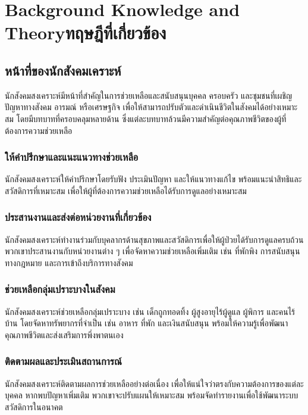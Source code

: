 \chapter{\ifenglish Background Knowledge and Theory\else ทฤษฎีที่เกี่ยวข้อง\fi}

\section{หน้าที่ของนักสังคมเคราะห์}

นักสังคมสงเคราะห์มีหน้าที่สำคัญในการช่วยเหลือและสนับสนุนบุคคล ครอบครัว และชุมชนที่เผชิญปัญหาทางสังคม อารมณ์ หรือเศรษฐกิจ เพื่อให้สามารถปรับตัวและดำเนินชีวิตในสังคมได้อย่างเหมาะสม โดยมีบทบาทที่ครอบคลุมหลายด้าน ซึ่งแต่ละบทบาทล้วนมีความสำคัญต่อคุณภาพชีวิตของผู้ที่ต้องการความช่วยเหลือ

\subsection{ให้คำปรึกษาและแนะแนวทางช่วยเหลือ}

นักสังคมสงเคราะห์ให้คำปรึกษาโดยรับฟัง ประเมินปัญหา และให้แนวทางแก้ไข พร้อมแนะนำสิทธิและสวัสดิการที่เหมาะสม เพื่อให้ผู้ที่ต้องการความช่วยเหลือได้รับการดูแลอย่างเหมาะสม
\subsection{ประสานงานและส่งต่อหน่วยงานที่เกี่ยวข้อง}

นักสังคมสงเคราะห์ทำงานร่วมกับบุคลากรด้านสุขภาพและสวัสดิการเพื่อให้ผู้ป่วยได้รับการดูแลครบถ้วน พวกเขาประสานงานกับหน่วยงานต่าง ๆ เพื่อจัดหาความช่วยเหลือเพิ่มเติม เช่น ที่พักพิง การสนับสนุนทางกฎหมาย และการเข้าถึงบริการทางสังคม

\subsection{ช่วยเหลือกลุ่มเปราะบางในสังคม}

นักสังคมสงเคราะห์ช่วยเหลือกลุ่มเปราะบาง เช่น เด็กถูกทอดทิ้ง ผู้สูงอายุไร้ผู้ดูแล ผู้พิการ และคนไร้บ้าน โดยจัดหาทรัพยากรที่จำเป็น เช่น อาหาร ที่พัก และเงินสนับสนุน พร้อมให้ความรู้เพื่อพัฒนาคุณภาพชีวิตและส่งเสริมการพึ่งพาตนเอง
\subsection{ติดตามผลและประเมินสถานการณ์}

นักสังคมสงเคราะห์ติดตามผลการช่วยเหลืออย่างต่อเนื่อง เพื่อให้แน่ใจว่าตรงกับความต้องการของแต่ละบุคคล หากพบปัญหาเพิ่มเติม พวกเขาจะปรับแผนให้เหมาะสม พร้อมจัดทำรายงานเพื่อใช้พัฒนาระบบสวัสดิการในอนาคต

